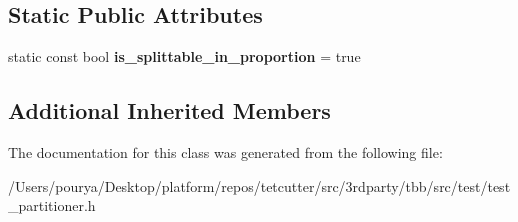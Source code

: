 \subsection*{Static Public Attributes}
\begin{DoxyCompactItemize}
\item 
\hypertarget{classtest__partitioner__utils_1_1TestRanges_1_1RoundedDownRange_a4be17cf3477f8ea8643011a49078a7ac}{}static const bool {\bfseries is\+\_\+splittable\+\_\+in\+\_\+proportion} = true\label{classtest__partitioner__utils_1_1TestRanges_1_1RoundedDownRange_a4be17cf3477f8ea8643011a49078a7ac}

\end{DoxyCompactItemize}
\subsection*{Additional Inherited Members}


The documentation for this class was generated from the following file\+:\begin{DoxyCompactItemize}
\item 
/\+Users/pourya/\+Desktop/platform/repos/tetcutter/src/3rdparty/tbb/src/test/test\+\_\+partitioner.\+h\end{DoxyCompactItemize}

